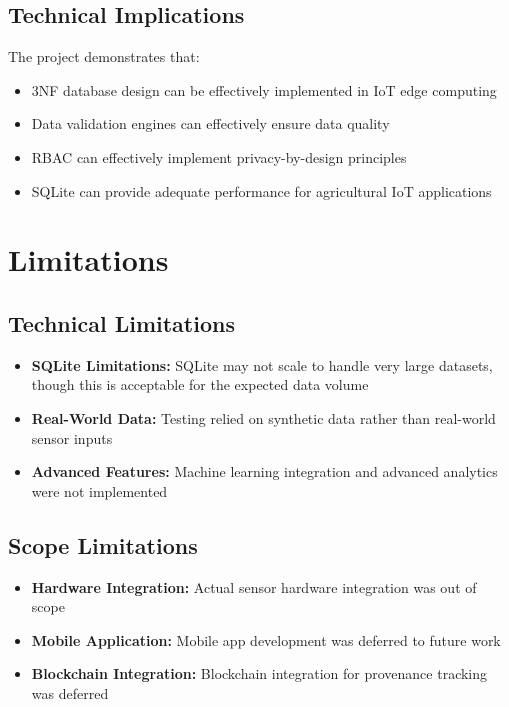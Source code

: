 \subsection{Technical Implications}

The project demonstrates that:

\begin{itemize}
    \item 3NF database design can be effectively implemented in IoT edge computing
    \item Data validation engines can effectively ensure data quality
    \item RBAC can effectively implement privacy-by-design principles
    \item SQLite can provide adequate performance for agricultural IoT applications
\end{itemize}

\section{Limitations}

\subsection{Technical Limitations}

\begin{itemize}
    \item \textbf{SQLite Limitations:} SQLite may not scale to handle very large datasets, though this is acceptable for the expected data volume
    \item \textbf{Real-World Data:} Testing relied on synthetic data rather than real-world sensor inputs
    \item \textbf{Advanced Features:} Machine learning integration and advanced analytics were not implemented
\end{itemize}

\subsection{Scope Limitations}

\begin{itemize}
    \item \textbf{Hardware Integration:} Actual sensor hardware integration was out of scope
    \item \textbf{Mobile Application:} Mobile app development was deferred to future work
    \item \textbf{Blockchain Integration:} Blockchain integration for provenance tracking was deferred
\end{itemize}

